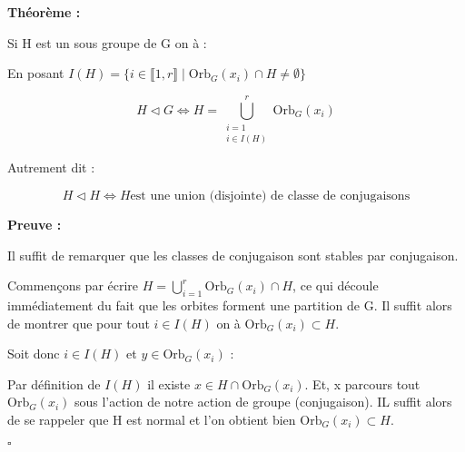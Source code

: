 \documentclass{report}
\renewenvironment{leftbar}{%
  \def\FrameCommand{\vrule width 0.4pt \hspace{10pt}}%
  \MakeFramed {\advance\hsize-\width \FrameRestore}}%
 {\endMakeFramed}%
\newenvironment{preuve}{\vspace*{0.5cm}
    \begin{leftbar}
    \noindent\textbf{Preuve :}\par}{
    \begin{flushright}
    $\square$
    \end{flushright}
    \end{leftbar}
}
\newenvironment{theoreme}[1][]{
    \begin{tcolorbox}[]
    \textbf{Théorème :} #1  \par} 
    {\end{tcolorbox}}
\newcommand{\dsp}{\displaystyle}
\newcommand{\orb}{\text{Orb}}
\begin{document}
\begin{theoreme}
Si H est un sous groupe de G on à :\par
En posant \( I(H) = \{ i\in \llbracket  1,r\rrbracket  \mid \orb_{G}(x_{i}) \cap H \neq \emptyset \} \)
\begin{center}
\[
H \triangleleft G \Longleftrightarrow H = \bigcup_{\substack{i=1 \\ i \in I(H)}}^{r} \orb_{G}(x_{i})
\]
\end{center}
Autrement dit :
\begin{center}
\[ H\triangleleft H \Longleftrightarrow H\text{est une union (disjointe) de classe de conjugaisons} \]
\end{center}
\end{theoreme}

\begin{preuve}
\fbox{$\Leftarrow$}\par 
Il suffit de remarquer que les classes de conjugaison sont stables par conjugaison.\par 

\fbox{$\Rightarrow$}\par
Commençons par écrire  $\dsp H = \bigcup_{i=1}^{r}\orb_{G}(x_{i})\cap H$, ce qui découle immédiatement du fait que les orbites forment une partition de G. Il suffit alors de montrer que pour tout $i\in I(H)$ on à $\orb_{G}(x_{i})\subset H$.\par 
Soit donc $i\in I(H)$ et $y\in \orb_{G}(x_{i})$ :\par 
Par définition de $I(H)$ il existe $x\in H \cap \orb_{G}(x_{i})$. Et, x parcours tout $\orb_{G}(x_{i})$ sous l'action de notre action de groupe (conjugaison). IL suffit alors de se rappeler que H est normal et l'on obtient bien $\orb_{G}(x_{i})\subset H$.
\end{preuve}
\end{document}
